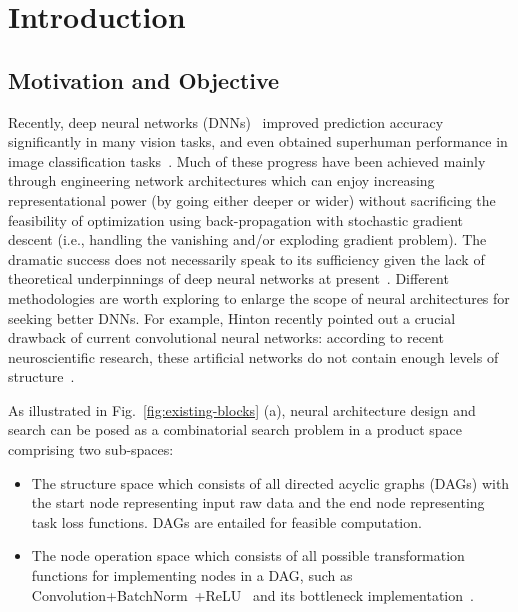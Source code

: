 \documentclass[10pt,twocolumn,letterpaper]{article}
\begin{document}
\section{Introduction}




\subsection{Motivation and Objective} 
Recently, deep neural networks (DNNs)~\cite{LeCunCNN,AlexNet} improved prediction accuracy significantly in many vision tasks, and even obtained superhuman performance in image classification tasks~\cite{ResidualNet,InceptionNet,DenseNet,DPN}.
Much of these progress have been achieved mainly through engineering network architectures which can enjoy increasing representational power (by going either deeper or wider) without sacrificing the feasibility of optimization using back-propagation with stochastic gradient descent (i.e., handling the  vanishing and/or exploding gradient problem). 
The dramatic success does not necessarily speak to its sufficiency given the lack of theoretical underpinnings of deep neural networks at present~\cite{BoundsOfDL}. Different methodologies are worth exploring to enlarge the scope of neural architectures for seeking better DNNs. 
For example, Hinton recently pointed out a crucial drawback of  current convolutional neural networks: according to recent neuroscientific research, these artificial networks do not contain enough levels of structure~\cite{Hinton,capsules}.

As illustrated in Fig.~\ref{fig:existing-blocks} (a), neural architecture design and search can be posed as a combinatorial search problem in a product space comprising two sub-spaces: 
\begin{itemize}[leftmargin=*]
\itemsep0em
    \item The structure space which consists of all directed acyclic graphs (DAGs) with the start node representing input raw data and the end node representing task loss functions. DAGs are entailed for feasible computation.
    \item The node operation space which consists of all possible transformation functions for implementing nodes in a DAG, such as Convolution+BatchNorm~\cite{BatchNorm}+ReLU~\cite{AlexNet} and its bottleneck implementation~\cite{ResidualNet}. 
\end{itemize}
\end{document}

